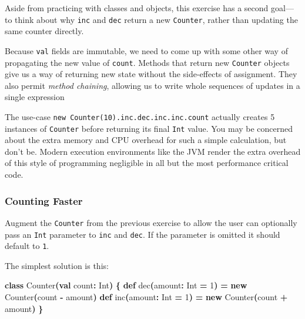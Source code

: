 \documentclass[11pt,a5paper,]{book}
\newenvironment{Shaded}{\begin{snugshade}}{\end{snugshade}}
\newcommand{\BuiltInTok}[1]{#1}
\newcommand{\DecValTok}[1]{\textcolor[rgb]{0.00,0.00,0.81}{#1}}
\newcommand{\FunctionTok}[1]{\textcolor[rgb]{0.00,0.00,0.00}{#1}}
\newcommand{\KeywordTok}[1]{\textcolor[rgb]{0.13,0.29,0.53}{\textbf{#1}}}
\newcommand{\NormalTok}[1]{#1}
\newcommand{\OperatorTok}[1]{\textcolor[rgb]{0.81,0.36,0.00}{\textbf{#1}}}
\begin{document}
Aside from practicing with classes and objects, this exercise has a
second goal---to think about why \texttt{inc} and \texttt{dec} return a
new \texttt{Counter}, rather than updating the same counter directly.

Because \texttt{val} fields are immutable, we need to come up with some
other way of propagating the new value of \texttt{count}. Methods that
return new \texttt{Counter} objects give us a way of returning new state
without the side-effects of assignment. They also permit \emph{method
chaining}, allowing us to write whole sequences of updates in a single
expression

The use-case \texttt{new\ Counter(10).inc.dec.inc.inc.count} actually
creates 5 instances of \texttt{Counter} before returning its final
\texttt{Int} value. You may be concerned about the extra memory and CPU
overhead for such a simple calculation, but don't be. Modern execution
environments like the JVM render the extra overhead of this style of
programming negligible in all but the most performance critical code.

\hypertarget{counting-faster}{%
\subsubsection{Counting Faster}\label{counting-faster}}

Augment the \texttt{Counter} from the previous exercise to allow the
user can optionally pass an \texttt{Int} parameter to \texttt{inc} and
\texttt{dec}. If the parameter is omitted it should default to
\texttt{1}.

The simplest solution is this:

\begin{Shaded}
\begin{Highlighting}[]
\KeywordTok{class} \FunctionTok{Counter}\OperatorTok{(}\KeywordTok{val}\NormalTok{ count}\OperatorTok{:} \BuiltInTok{Int}\OperatorTok{)} \OperatorTok{\{}
  \KeywordTok{def} \FunctionTok{dec}\OperatorTok{(}\NormalTok{amount}\OperatorTok{:} \BuiltInTok{Int} \OperatorTok{=} \DecValTok{1}\OperatorTok{)} \OperatorTok{=} \KeywordTok{new} \FunctionTok{Counter}\OperatorTok{(}\NormalTok{count }\OperatorTok{{-}}\NormalTok{ amount}\OperatorTok{)}
  \KeywordTok{def} \FunctionTok{inc}\OperatorTok{(}\NormalTok{amount}\OperatorTok{:} \BuiltInTok{Int} \OperatorTok{=} \DecValTok{1}\OperatorTok{)} \OperatorTok{=} \KeywordTok{new} \FunctionTok{Counter}\OperatorTok{(}\NormalTok{count }\OperatorTok{+}\NormalTok{ amount}\OperatorTok{)}
\OperatorTok{\}}
\end{Highlighting}
\end{Shaded}
\end{document}
